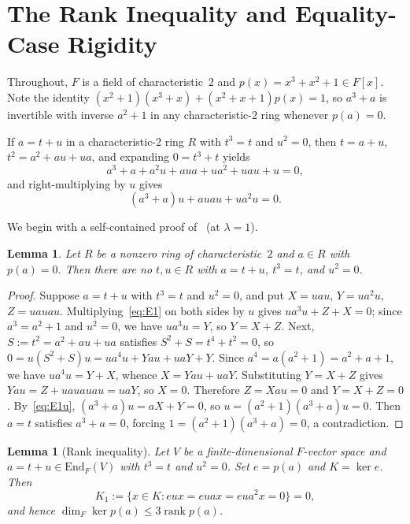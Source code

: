 \documentclass[11pt]{article}
\newtheorem{lemma}[theorem]{Lemma}
\begin{document}
\section{The Rank Inequality and Equality-Case Rigidity}

Throughout, $F$ is a field of characteristic~$2$ and $p(x) = x^3 + x^2 + 1 \in F[x]$. Note the identity $(x^2 + 1)(x^3 + x) + (x^2 + x + 1)p(x) = 1$, so $a^3 + a$ is invertible with inverse $a^2 + 1$ in any characteristic-$2$ ring whenever $p(a) = 0$.

If $a = t + u$ in a characteristic-$2$ ring $R$ with $t^3 = t$ and $u^2 = 0$, then $t = a + u$, $t^2 = a^2 + au + ua$, and expanding $0 = t^3 + t$ yields
\begin{equation}\label{eq:E1}
  a^3 + a + a^2 u + a u a + u a^2 + u a u + u = 0,
\end{equation}
and right-multiplying by $u$ gives
\begin{equation}\label{eq:E1u}
  (a^3 + a)u + a u a u + u a^2 u = 0.
\end{equation}

We begin with a self-contained proof of~\cite[Theorem~3.1]{PD2026} (at $\lambda = 1$).

\begin{lemma}\label{lem:zero}
Let $R$ be a nonzero ring of characteristic~$2$ and $a \in R$ with $p(a) = 0$. Then there are no $t, u \in R$ with $a = t + u$, $t^3 = t$, and $u^2 = 0$.
\end{lemma}

\begin{proof}
Suppose $a = t + u$ with $t^3 = t$ and $u^2 = 0$, and put $X = uau$, $Y = ua^2u$, $Z = uauau$. Multiplying~\eqref{eq:E1} on both sides by $u$ gives $ua^3u + Z + X = 0$; since $a^3 = a^2 + 1$ and $u^2 = 0$, we have $ua^3u = Y$, so $Y = X + Z$. Next, $S := t^2 = a^2 + au + ua$ satisfies $S^2 + S = t^4 + t^2 = 0$, so $0 = u(S^2 + S)u = ua^4u + Yau + uaY + Y$. Since $a^4 = a(a^2 + 1) = a^2 + a + 1$, we have $ua^4u = Y + X$, whence $X = Yau + uaY$. Substituting $Y = X + Z$ gives $Yau = Z + uauauau = uaY$, so $X = 0$. Therefore $Z = Xau = 0$ and $Y = X + Z = 0$. By~\eqref{eq:E1u}, $(a^3 + a)u = aX + Y = 0$, so $u = (a^2 + 1)(a^3 + a)u = 0$. Then $a = t$ satisfies $a^3 + a = 0$, forcing $1 = (a^2 + 1)(a^3 + a) = 0$, a contradiction.
\end{proof}

\begin{lemma}[Rank inequality]\label{lem:A}
Let $V$ be a finite-dimensional $F$-vector space and $a = t + u \in \mathrm{End}_F(V)$ with $t^3 = t$ and $u^2 = 0$. Set $e = p(a)$ and $K = \ker e$. Then
\[
  K_1 := \{x \in K : eux = euax = eua^2x = 0\} = 0,
\]
and hence $\dim_F \ker p(a) \le 3 \operatorname{rank} p(a)$.
\end{lemma}
\end{document}
